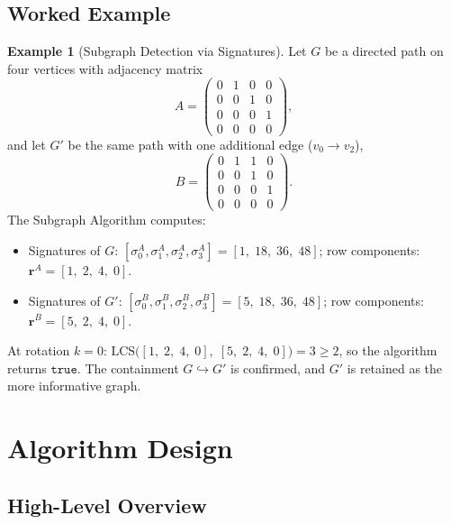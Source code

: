 ﻿\documentclass[12pt,a4paper]{article}
\theoremstyle{plain}
\theoremstyle{definition}
\newtheorem{example}[theorem]{Example}
\theoremstyle{remark}
\begin{document}
	\subsection{Worked Example}

	\begin{example}[Subgraph Detection via Signatures]
		\label{ex:subgraph}
		Let $G$ be a directed path on four vertices with adjacency matrix
		\[
		A = \begin{pmatrix}
			0 & 1 & 0 & 0 \\
			0 & 0 & 1 & 0 \\
			0 & 0 & 0 & 1 \\
			0 & 0 & 0 & 0
		\end{pmatrix},
		\]
		and let $G'$ be the same path with one additional edge ($v_0 \to v_2$),
		\[
		B = \begin{pmatrix}
			0 & 1 & 1 & 0 \\
			0 & 0 & 1 & 0 \\
			0 & 0 & 0 & 1 \\
			0 & 0 & 0 & 0
		\end{pmatrix}.
		\]
		The Subgraph Algorithm computes:
		\begin{itemize}
			\item Signatures of $G$:
			$[\sigma_0^A, \sigma_1^A, \sigma_2^A, \sigma_3^A] = [1,\; 18,\; 36,\; 48]$;
			\quad row components: $\mathbf{r}^A = [1,\; 2,\; 4,\; 0]$.
			\item Signatures of $G'$:
			$[\sigma_0^B, \sigma_1^B, \sigma_2^B, \sigma_3^B] = [5,\; 18,\; 36,\; 48]$;
			\quad row components: $\mathbf{r}^B = [5,\; 2,\; 4,\; 0]$.
		\end{itemize}
		At rotation $k = 0$:
		$\mathrm{LCS}\bigl([1,\;2,\;4,\;0],\;[5,\;2,\;4,\;0]\bigr) = 3 \geq 2$,
		so the algorithm returns $\mathtt{true}$.  The containment
		$G \hookrightarrow G'$ is confirmed, and $G'$ is retained as the more
		informative graph.
	\end{example}

	\section{Algorithm Design}
	\label{sec:algo}
	
	\subsection{High-Level Overview}
	
\end{document}
